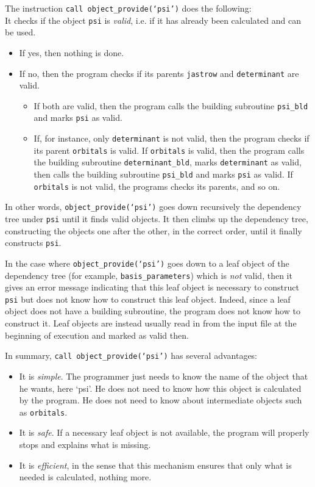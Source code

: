 \documentclass[a4paper,11pt]{article}
\begin{document}
\vspace{0.5cm}
The instruction {\tt call object\_provide(`psi')} does the following:\\
It checks if the object {\tt psi} is {\it valid}, i.e. if it has already been calculated and can be used.
\begin{itemize}
\item If yes, then nothing is done. 
\item If no, then the program checks if its parents {\tt jastrow} and {\tt determinant} are valid. 
\begin{itemize}
\item If both are valid, then the program calls the building subroutine {\tt psi\_bld} and marks {\tt psi} as valid.
\item If, for instance, only {\tt determinant} is not valid, then the program checks if its parent {\tt orbitals} is valid. If {\tt orbitals} is valid, then the program calls the building subroutine {\tt determinant\_bld}, marks {\tt determinant} as valid, then calls the building subroutine {\tt psi\_bld} and marks {\tt psi} as valid. If {\tt orbitals} is not valid, the programs checks its parents, and so on.
\end{itemize}
\end{itemize}
In other words, {\tt object\_provide(`psi')} goes down recursively the dependency tree under {\tt psi} until it finds valid objects. It then climbs up the dependency tree, constructing the objects one after the other, in the correct order, until it finally constructs {\tt psi}.

In the case where {\tt object\_provide(`psi')} goes down to a leaf object of the dependency tree (for example, {\tt basis\_parameters}) which is {\it not} valid, then it gives an error message indicating that this leaf object is necessary to construct {\tt psi} but does not know how to construct this leaf object. Indeed, since a leaf object does not have a building subroutine, the program does not know how to construct it. Leaf objects are instead usually read in from the input file at the beginning of execution and marked as valid then.

\vspace{0.5cm}
In summary, {\tt call object\_provide(`psi')} has several advantages:
\begin{itemize}
\item It is {\it simple}. The programmer just needs to know the name of the object that he wants, here `psi'. He does not need to know how this object is calculated by the program. He does not need to know about intermediate objects such as {\tt orbitals}.
\item It is {\it safe}. If a necessary leaf object is not available, the program will properly stops and explains what is missing.
\item It is {\it efficient}, in the sense that this mechanism ensures that only what is needed is calculated, nothing more.
\end{itemize}
\end{document}
